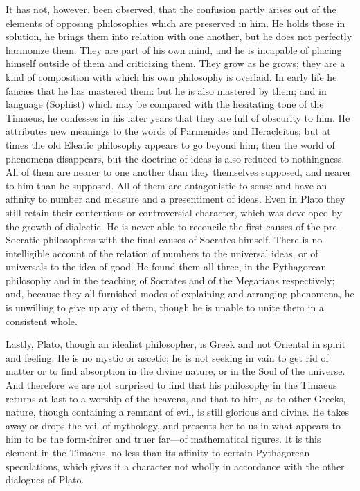 \documentclass[11pt,letter]{article}
\begin{document}
\par  It has not, however, been observed, that the confusion partly arises out of the elements of opposing philosophies which are preserved in him. He holds these in solution, he brings them into relation with one another, but he does not perfectly harmonize them. They are part of his own mind, and he is incapable of placing himself outside of them and criticizing them. They grow as he grows; they are a kind of composition with which his own philosophy is overlaid. In early life he fancies that he has mastered them: but he is also mastered by them; and in language (Sophist) which may be compared with the hesitating tone of the Timaeus, he confesses in his later years that they are full of obscurity to him. He attributes new meanings to the words of Parmenides and Heracleitus; but at times the old Eleatic philosophy appears to go beyond him; then the world of phenomena disappears, but the doctrine of ideas is also reduced to nothingness. All of them are nearer to one another than they themselves supposed, and nearer to him than he supposed. All of them are antagonistic to sense and have an affinity to number and measure and a presentiment of ideas. Even in Plato they still retain their contentious or controversial character, which was developed by the growth of dialectic. He is never able to reconcile the first causes of the pre-Socratic philosophers with the final causes of Socrates himself. There is no intelligible account of the relation of numbers to the universal ideas, or of universals to the idea of good. He found them all three, in the Pythagorean philosophy and in the teaching of Socrates and of the Megarians respectively; and, because they all furnished modes of explaining and arranging phenomena, he is unwilling to give up any of them, though he is unable to unite them in a consistent whole.

\par  Lastly, Plato, though an idealist philosopher, is Greek and not Oriental in spirit and feeling. He is no mystic or ascetic; he is not seeking in vain to get rid of matter or to find absorption in the divine nature, or in the Soul of the universe. And therefore we are not surprised to find that his philosophy in the Timaeus returns at last to a worship of the heavens, and that to him, as to other Greeks, nature, though containing a remnant of evil, is still glorious and divine. He takes away or drops the veil of mythology, and presents her to us in what appears to him to be the form-fairer and truer far—of mathematical figures. It is this element in the Timaeus, no less than its affinity to certain Pythagorean speculations, which gives it a character not wholly in accordance with the other dialogues of Plato.
\end{document}
